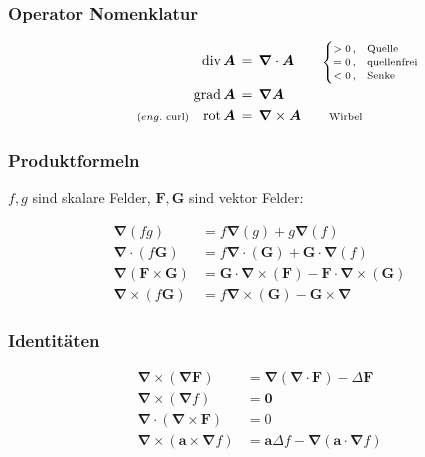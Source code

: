 \documentclass[titlepage,11pt,a4paper,ngerman]{report}
\renewcommand{\vec}[1]{\boldsymbol{#1}}
\newcommand{\vabla}{\boldsymbol{\nabla}}
\renewcommand{\paragraph}[1]{\subsubsection{#1}}
\begin{document}
\paragraph{Operator Nomenklatur}
\begin{align*}
\text{div}\, \vec{A} \, &= \, \vec{\nabla}\cdot \vec{A} \qquad \rlap{\scriptsize{$\begin{cases} 
		>0 \, , & \mathrm{Quelle} \\
		=0 \, , & \mathrm{quellenfrei}\\
		<0\, , & \mathrm{Senke}
	\end{cases}$}} \\
\text{grad}\,\vec{A} \, &= \, \vec{\nabla}\vec{A} \\
\llap{\scriptsize{($eng.$ curl)}} \quad \text{rot}\, \vec{A} \, &= \, \vec{\nabla}\times \vec{A} \qquad \rlap{\scriptsize{Wirbel}}
\end{align*}

\paragraph{Produktformeln}
$f, g$ sind skalare Felder, $\vec{F}, \vec{G}$ sind vektor Felder:

\begin{align*}
 	\vabla(fg) &= f \vabla (g) + g \vabla (f)\\
 	\vabla \cdot (f \vec{G}) &= f \vabla \cdot (\vec{G}) + \vec{G} \cdot \vabla (f)\\
 	\vabla (\vec{F} \times \vec{G}) &= \vec{G} \cdot \vabla \times (\vec{F}) - \vec{F} \cdot \vabla \times (\vec{G})\\
 	\vabla \times (f \vec{G}) &= f \vabla \times (\vec{G}) - \vec{G} \times \vabla
\end{align*}

\paragraph{Identitäten}

\begin{align*}
	\vec{\nabla}\times(\vec{\nabla}\vec{F})&=\vec{\nabla}(\vec{\nabla}\cdot\vec{F})-\Delta\vec{F}\\
	\vec{\nabla}\times(\vec{\nabla}f)&=\vec{0}\\
	\vec{\nabla}\cdot(\vec{\nabla}\times\vec{F})&=0\\
	\vec{\nabla}\times(\vec{a}\times\vec{\nabla}f)&=\vec{a}\Delta f-\vec{\nabla}(\vec{a}\cdot\vec{\nabla}f)
\end{align*}
\end{document}
